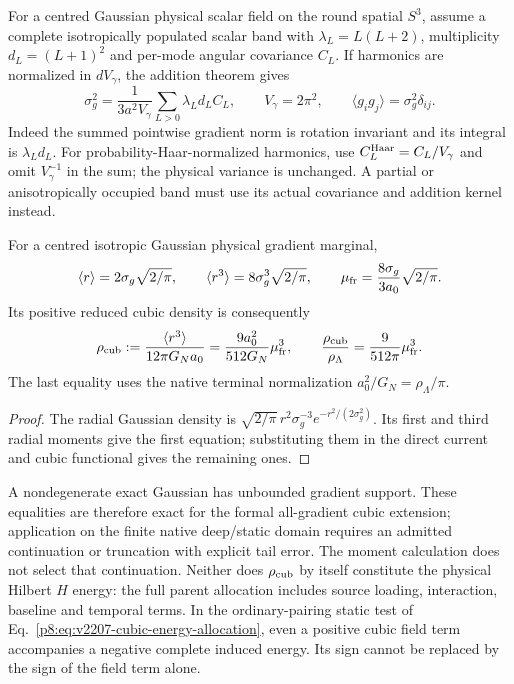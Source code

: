 \documentclass[12pt,a4paper]{article}
\begin{document}
For a centred Gaussian physical scalar field on the round spatial
$S^3$, assume a complete isotropically populated scalar band with
$\lambda_L=L(L+2)$, multiplicity $d_L=(L+1)^2$ and per-mode angular
covariance $C_L$. If harmonics are normalized in $dV_\gamma$, the addition
theorem gives
\begin{equation}
\label{p8:eq:v2209-state-rar-s3-covariance}
 \sigma_g^2=\frac{1}{3a^2V_\gamma}
       \sum_{L>0}\lambda_Ld_LC_L,\qquad V_\gamma=2\pi^2,
 \qquad \langle g_ig_j\rangle=\sigma_g^2\delta_{ij}.
\end{equation}
Indeed the summed pointwise gradient norm is rotation invariant and its
integral is $\lambda_Ld_L$. For probability-Haar-normalized harmonics,
use $C_L^{\rm Haar}=C_L/V_\gamma$ and omit $V_\gamma^{-1}$ in the sum;
the physical variance is unchanged. A partial or anisotropically occupied
band must use its actual covariance and addition kernel instead.

\begin{proposition}
\label{p8:prop:v2209-state-rar-gaussian-moments}
For a centred isotropic Gaussian physical gradient marginal,
\begin{equation}
\label{p8:eq:v2209-state-rar-gaussian-moments}
 \langle r\rangle=2\sigma_g\sqrt{2/\pi},\qquad
 \langle r^3\rangle=8\sigma_g^3\sqrt{2/\pi},\qquad
 \mu_{\rm fr}=\frac{8\sigma_g}{3a_0}\sqrt{2/\pi}.
\end{equation}
Its positive reduced cubic density is consequently
\begin{equation}
\label{p8:eq:v2209-state-rar-gaussian-density}
 \rho_{\rm cub}:=\frac{\langle r^3\rangle}{12\pi G_Na_0}
   =\frac{9a_0^2}{512G_N}\mu_{\rm fr}^3,
 \qquad \frac{\rho_{\rm cub}}{\rho_\Lambda}
   =\frac{9}{512\pi}\mu_{\rm fr}^3.
\end{equation}
The last equality uses the native terminal normalization
$a_0^2/G_N=\rho_\Lambda/\pi$.
\end{proposition}
\begin{proof}
The radial Gaussian density is
$\sqrt{2/\pi}\,r^2\sigma_g^{-3}e^{-r^2/(2\sigma_g^2)}$.
Its first and third radial moments give the first equation; substituting
them in the direct current and cubic functional gives the remaining ones.
\end{proof}

A nondegenerate exact Gaussian has unbounded gradient support. These
equalities are therefore exact for the formal all-gradient cubic extension;
application on the finite native deep/static domain requires an admitted
continuation or truncation with explicit tail error. The moment calculation
does not select that continuation. Neither does $\rho_{\rm cub}$ by itself
constitute the physical Hilbert $H$ energy: the full parent allocation
includes source loading, interaction, baseline and temporal terms. In the
ordinary-pairing static test of Eq.~\eqref{p8:eq:v2207-cubic-energy-allocation},
even a positive cubic field term accompanies a negative complete induced
energy. Its sign cannot be replaced by the sign of the field term alone.
\end{document}
